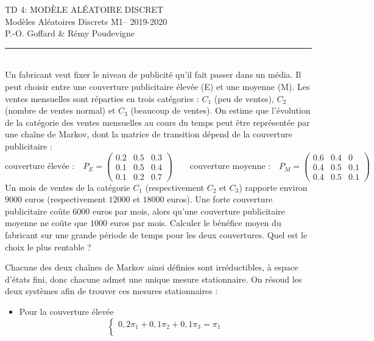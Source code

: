 \documentclass[11pt]{exam}
\def\semester{2019-2020}
\def\course{Modèles Aléatoires Discrets M1}
\def\name{P.-O. Goffard \& Rémy Poudevigne}
\def\title{\MakeUppercase{TD 4: Modèle Aléatoire Discret}}
\begin{document}
{\center \textsc{\Large\title}\\
	\vspace*{1em}
	\course -- \semester\\
	\name\\
	\vspace*{2em}
	\hrule
\vspace*{2em}}
\begin{questions}


\\
Un fabricant veut fixer le niveau de publicité qu'il fait passer dans un média. Il peut choisir entre une couverture publicitaire élevée (E) et une moyenne (M). Les ventes mensuelles sont réparties en trois catégories : $C_1$ (peu de ventes), $C_2$ (nombre de ventes normal) et $C_3$ (beaucoup de ventes). On estime que l'évolution de la catégorie des ventes mensuelles au cours du temps peut être représentée par une chaîne de Markov, dont la matrice de transition dépend de la couverture publicitaire :
$$\mbox{couverture élevée :}\quad P_E=\left(\begin{matrix}%
0.2&0.5&0.3\\0.1&0.5&0.4\\0.1&0.2&0.7
\end{matrix}
\right)
\qquad\mbox{couverture moyenne :}\quad
P_M=\left(\begin{matrix}%
0.6&0.4&0\\0.4&0.5&0.1\\0.4&0.5&0.1
\end{matrix}
\right) $$
Un mois de ventes de la catégorie $C_1$ (respectivement $C_2$ et $C_3$) rapporte environ $9000$ euros (respectivement $12 000$ et $18 000$ euros). Une forte couverture publicitaire coûte $6000$ euros par mois, alors qu'une couverture publicitaire moyenne ne coûte que $1000$ euros par mois. Calculer le bénéfice moyen du fabricant sur une grande période de temps pour les deux couvertures. Quel est le choix le plus rentable ?
\begin{solution}
Chacune des deux chaînes de Markov ainsi définies sont
irréductibles, à espace d'états fini, donc chacune admet une unique
mesure stationnaire. On résoud les deux systèmes afin de trouver ces
mesures stationnaires :
\begin{itemize}
\item Pour la couverture élevée
$$
\left\{ \begin{array}{l}
0,2 \pi_1 + 0,1 \pi_2 + 0,1 \pi_3 =\pi_1 \\

\end{array}$$
\end{itemize}
\end{solution}
\end{questions}
\end{document}
